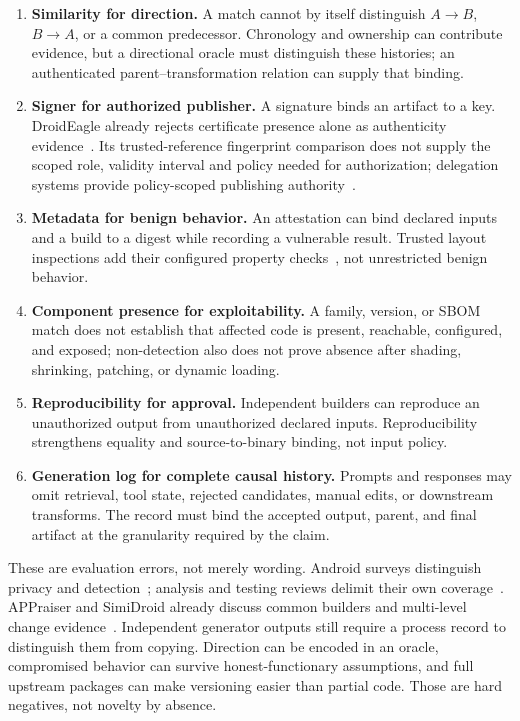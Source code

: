 \begin{enumerate}
\item \textbf{Similarity for direction.} A match cannot by itself distinguish $A\rightarrow B$, $B\rightarrow A$, or a common predecessor. Chronology and ownership can contribute evidence, but a directional oracle must distinguish these histories; an authenticated parent--transformation relation can supply that binding.
\item \textbf{Signer for authorized publisher.} A signature binds an artifact to a key. DroidEagle already rejects certificate presence alone as authenticity evidence~\cite{droideagle}. Its trusted-reference fingerprint comparison does not supply the scoped role, validity interval and policy needed for authorization; delegation systems provide policy-scoped publishing authority~\cite{tuf,diplomat}.
\item \textbf{Metadata for benign behavior.} An attestation can bind declared inputs and a build to a digest while recording a vulnerable result. Trusted layout inspections add their configured property checks~\cite{intoto}, not unrestricted benign behavior.
\item \textbf{Component presence for exploitability.} A family, version, or SBOM match does not establish that affected code is present, reachable, configured, and exposed; non-detection also does not prove absence after shading, shrinking, patching, or dynamic loading.
\item \textbf{Reproducibility for approval.} Independent builders can reproduce an unauthorized output from unauthorized declared inputs. Reproducibility strengthens equality and source-to-binary binding, not input policy.
\item \textbf{Generation log for complete causal history.} Prompts and responses may omit retrieval, tool state, rejected candidates, manual edits, or downstream transforms. The record must bind the accepted output, parent, and final artifact at the granularity required by the claim.
\end{enumerate}

These are evaluation errors, not merely wording. Android surveys distinguish privacy and detection~\cite{xuandroid,tamandroid}; analysis and testing reviews delimit their own coverage~\cite{staticandroid,androidtesting}. APPraiser and SimiDroid already discuss common builders and multi-level change evidence~\cite{appraiser,simidroid}. Independent generator outputs still require a process record to distinguish them from copying. Direction can be encoded in an oracle, compromised behavior can survive honest-functionary assumptions, and full upstream packages can make versioning easier than partial code. Those are hard negatives, not novelty by absence.


